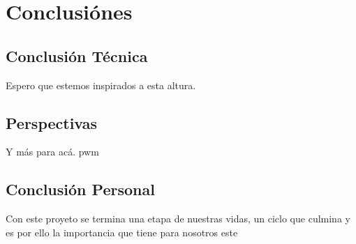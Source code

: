 \chapter{Conclusiónes}
\label{ch:conclusiones}

\section{Conclusión Técnica}
\label{sec:ConclusionTecnica}
Espero que estemos inspirados a esta altura. \cite{Gardner}


\section{Perspectivas}
\label{sec:Perspectivas}
Y más para acá. \gls{pwm}

\section{Conclusión Personal}
\label{sec:ConclusionPersonal}

Con este proyeto se termina una etapa de nuestras vidas, un
ciclo que culmina y es por ello la importancia que tiene para
nosotros este
